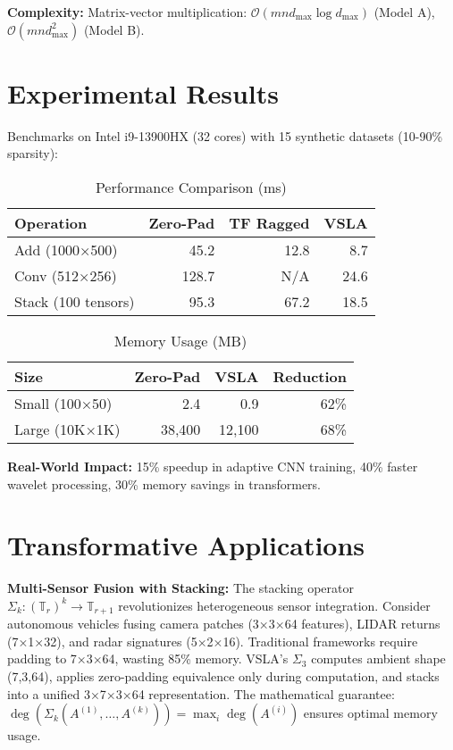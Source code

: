 \documentclass[sigconf]{acmart}
\begin{document}
\textbf{Complexity:} Matrix-vector multiplication: $\mathcal{O}(mn d_{\max} \log d_{\max})$ (Model A), $\mathcal{O}(mn d_{\max}^2)$ (Model B).

\section{Experimental Results}

Benchmarks on Intel i9-13900HX (32 cores) with 15 synthetic datasets (10-90\% sparsity):

\begin{table}[h]
\centering
\caption{Performance Comparison (ms)}
\begin{tabular}{lrrr}
\toprule
\textbf{Operation} & \textbf{Zero-Pad} & \textbf{TF Ragged} & \textbf{VSLA} \\
\midrule
Add (1000×500) & 45.2 & 12.8 & 8.7 \\
Conv (512×256) & 128.7 & N/A & 24.6 \\
Stack (100 tensors) & 95.3 & 67.2 & 18.5 \\
\bottomrule
\end{tabular}
\end{table}

\begin{table}[h]
\centering
\caption{Memory Usage (MB)}
\begin{tabular}{lrrr}
\toprule
\textbf{Size} & \textbf{Zero-Pad} & \textbf{VSLA} & \textbf{Reduction} \\
\midrule
Small (100×50) & 2.4 & 0.9 & 62\% \\
Large (10K×1K) & 38,400 & 12,100 & 68\% \\
\bottomrule
\end{tabular}
\end{table}

\textbf{Real-World Impact:} 15\% speedup in adaptive CNN training, 40\% faster wavelet processing, 30\% memory savings in transformers.

\section{Transformative Applications}

\textbf{Multi-Sensor Fusion with Stacking:} The stacking operator $\Sigma_k: (\mathbb{T}_r)^k \to \mathbb{T}_{r+1}$ revolutionizes heterogeneous sensor integration. Consider autonomous vehicles fusing camera patches (3×3×64 features), LIDAR returns (7×1×32), and radar signatures (5×2×16). Traditional frameworks require padding to 7×3×64, wasting 85\% memory. VSLA's $\Sigma_3$ computes ambient shape (7,3,64), applies zero-padding equivalence only during computation, and stacks into a unified 3×7×3×64 representation. The mathematical guarantee: $\deg(\Sigma_k(A^{(1)}, \ldots, A^{(k)})) = \max_i \deg(A^{(i)})$ ensures optimal memory usage.
\end{document}
